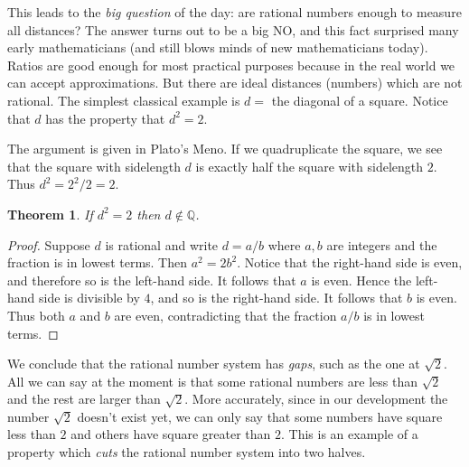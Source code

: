 \documentclass[11pt,oneside]{amsbook}
\newcommand{\Q}{\mathbb Q}
\theoremstyle{definition}
\theoremstyle{plain}
\newtheorem{theorem}{Theorem}[section]
\theoremstyle{definition}
\theoremstyle{remark}
\numberwithin{equation}{section}
\numberwithin{figure}{section}
\begin{document}
This leads to the \emph{big question} of the day: are rational numbers enough to measure all distances? The answer turns out to be a big NO, and this fact surprised many early mathematicians (and still blows minds of new mathematicians today). Ratios are good enough for most practical purposes because in the real world we can accept approximations. But there are ideal distances (numbers) which are not rational. The simplest classical example is $d=$ the diagonal of a square. Notice that $d$ has the property that $d^2=2$.

\begin{center}
\quad
{}
\end{center}

The argument is given in Plato's Meno. If we quadruplicate the square, we see that the square with sidelength $d$ is exactly half the square with sidelength $2$. Thus $d^2=2^2/2=2$.

\begin{theorem}
  \label{thm:root-2-irrational}
  If $d^2=2$ then $d\notin\Q$.
\end{theorem}

\begin{proof}
  Suppose $d$ is rational and write $d=a/b$ where $a,b$ are integers and the fraction is in lowest terms. Then $a^2=2b^2$. Notice that the right-hand side is even, and therefore so is the left-hand side. It follows that $a$ is even. Hence the left-hand side is divisible by $4$, and so is the right-hand side. It follows that $b$ is even. Thus both $a$ and $b$ are even, contradicting that the fraction $a/b$ is in lowest terms.
\end{proof}

We conclude that the rational number system has \emph{gaps}, such as the one at $\sqrt2$. All we can say at the moment is that some rational numbers are less than $\sqrt2$ and the rest are larger than $\sqrt{2}$. More accurately, since in our development the number $\sqrt{2}$ doesn't exist yet, we can only say that some numbers have square less than $2$ and others have square greater than $2$. This is an example of a property which \emph{cuts} the rational number system into two halves.
\end{document}
